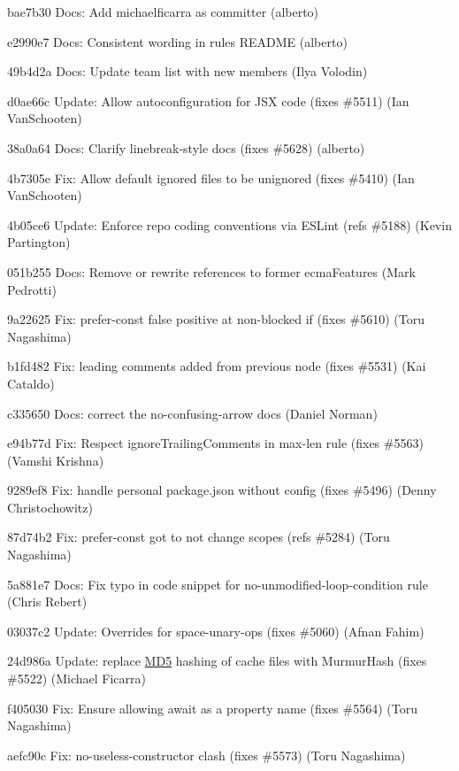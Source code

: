 \begin{DoxyItemize}
\item bae7b30 Docs\+: Add michaelficarra as committer (alberto)
\item e2990e7 Docs\+: Consistent wording in rules R\+E\+A\+D\+ME (alberto)
\item 49b4d2a Docs\+: Update team list with new members (Ilya Volodin)
\item d0ae66c Update\+: Allow autoconfiguration for J\+SX code (fixes \#5511) (Ian Van\+Schooten)
\item 38a0a64 Docs\+: Clarify {\ttfamily linebreak-\/style} docs (fixes \#5628) (alberto)
\item 4b7305e Fix\+: Allow default ignored files to be unignored (fixes \#5410) (Ian Van\+Schooten)
\item 4b05ce6 Update\+: Enforce repo coding conventions via E\+S\+Lint (refs \#5188) (Kevin Partington)
\item 051b255 Docs\+: Remove or rewrite references to former ecma\+Features (Mark Pedrotti)
\item 9a22625 Fix\+: {\ttfamily prefer-\/const} false positive at non-\/blocked if (fixes \#5610) (Toru Nagashima)
\item b1fd482 Fix\+: leading comments added from previous node (fixes \#5531) (Kai Cataldo)
\item c335650 Docs\+: correct the no-\/confusing-\/arrow docs (Daniel Norman)
\item e94b77d Fix\+: Respect \textquotesingle{}ignore\+Trailing\+Comments\textquotesingle{} in max-\/len rule (fixes \#5563) (Vamshi Krishna)
\item 9289ef8 Fix\+: handle personal package.\+json without config (fixes \#5496) (Denny Christochowitz)
\item 87d74b2 Fix\+: {\ttfamily prefer-\/const} got to not change scopes (refs \#5284) (Toru Nagashima)
\item 5a881e7 Docs\+: Fix typo in code snippet for no-\/unmodified-\/loop-\/condition rule (Chris Rebert)
\item 03037c2 Update\+: Overrides for space-\/unary-\/ops (fixes \#5060) (Afnan Fahim)
\item 24d986a Update\+: replace \mbox{\hyperlink{class_m_d5}{M\+D5}} hashing of cache files with Murmur\+Hash (fixes \#5522) (Michael Ficarra)
\item f405030 Fix\+: Ensure allowing {\ttfamily await} as a property name (fixes \#5564) (Toru Nagashima)
\item aefc90c Fix\+: {\ttfamily no-\/useless-\/constructor} clash (fixes \#5573) (Toru Nagashima)

\end{DoxyItemize}

